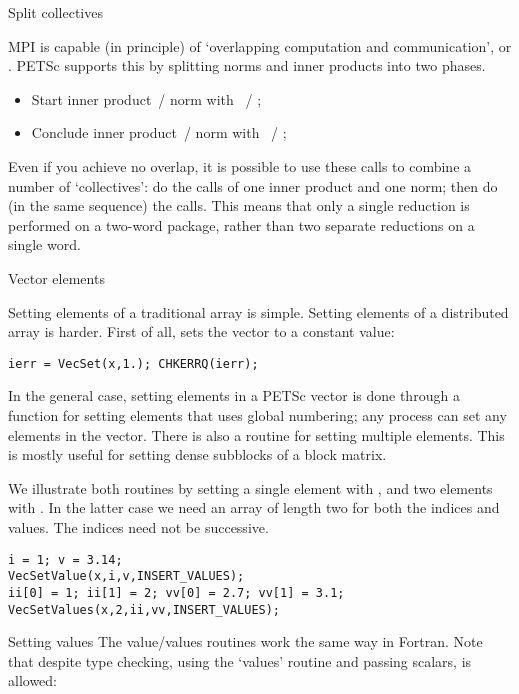  {Split collectives}

MPI is capable (in principle) of `overlapping computation and communication',
or . PETSc supports this
by splitting norms and inner products into two phases.
\begin{itemize}
\item Start inner product~/ norm with ~/
  ;
\item Conclude inner product~/ norm with ~/
  ;
\end{itemize}
Even if you achieve no overlap, it is possible to use these calls to
combine a number of `collectives': do the  calls of one inner
product and one norm; then do (in the same sequence) the  calls.
This means that only a single reduction is performed on a two-word
package, rather than two separate reductions on a single word.

 {Vector elements}

Setting elements of a traditional array is simple. Setting elements of
a distributed array is harder.
First of all,  sets the vector to a constant value:
\begin{lstlisting}
ierr = VecSet(x,1.); CHKERRQ(ierr);  
\end{lstlisting}

In the general case, setting elements in a PETSc vector is done
through a
function  for setting elements that uses global numbering; any
process can set any elements in the vector.
%
There is also a routine  for setting
multiple elements. This is mostly useful for setting dense subblocks
of a block matrix.

We illustrate both routines by setting a single element with ,
and two elements with . In the latter case
we need an array of length two for both the indices and values. The indices need
not be successive.

\lstset{language=C}
\begin{lstlisting}
i = 1; v = 3.14;
VecSetValue(x,i,v,INSERT_VALUES);
ii[0] = 1; ii[1] = 2; vv[0] = 2.7; vv[1] = 3.1;
VecSetValues(x,2,ii,vv,INSERT_VALUES);
\end{lstlisting}

\begin{fortrannote}{Setting values}
  The value/values routines work the same way in Fortran.
  Note that despite type checking, using the `values' routine
  and passing scalars, is allowed:
\end{fortrannote}

